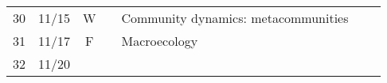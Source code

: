 \documentclass[]{article}
\begin{document}
\begin{longtable}[]{@{}cccllll@{}}
\begin{minipage}[t]{0.12\columnwidth}\centering\strut
30\strut
\end{minipage} & \begin{minipage}[t]{0.08\columnwidth}\centering\strut
11/15\strut
\end{minipage} & \begin{minipage}[t]{0.07\columnwidth}\centering\strut
W\strut
\end{minipage} & \begin{minipage}[t]{0.10\columnwidth}\raggedright\strut
\strut
\end{minipage} & \begin{minipage}[t]{0.11\columnwidth}\raggedright\strut
Community dynamics: metacommunities\strut
\end{minipage} & \begin{minipage}[t]{0.11\columnwidth}\raggedright\strut
\strut
\end{minipage} & \begin{minipage}[t]{0.16\columnwidth}\raggedright\strut
\strut
\end{minipage}\tabularnewline
\begin{minipage}[t]{0.12\columnwidth}\centering\strut
31\strut
\end{minipage} & \begin{minipage}[t]{0.08\columnwidth}\centering\strut
11/17\strut
\end{minipage} & \begin{minipage}[t]{0.07\columnwidth}\centering\strut
F\strut
\end{minipage} & \begin{minipage}[t]{0.10\columnwidth}\raggedright\strut
\strut
\end{minipage} & \begin{minipage}[t]{0.11\columnwidth}\raggedright\strut
Macroecology\strut
\end{minipage} & \begin{minipage}[t]{0.11\columnwidth}\raggedright\strut
\strut
\end{minipage} & \begin{minipage}[t]{0.16\columnwidth}\raggedright\strut
\strut
\end{minipage}\tabularnewline
\begin{minipage}[t]{0.12\columnwidth}\centering\strut
32\strut
\end{minipage} & \begin{minipage}[t]{0.08\columnwidth}\centering\strut
11/20\strut
\end{minipage} & \begin{minipage}[t]{0.07\columnwidth}\centering\strut

\end{minipage}
\end{longtable}
\end{document}
